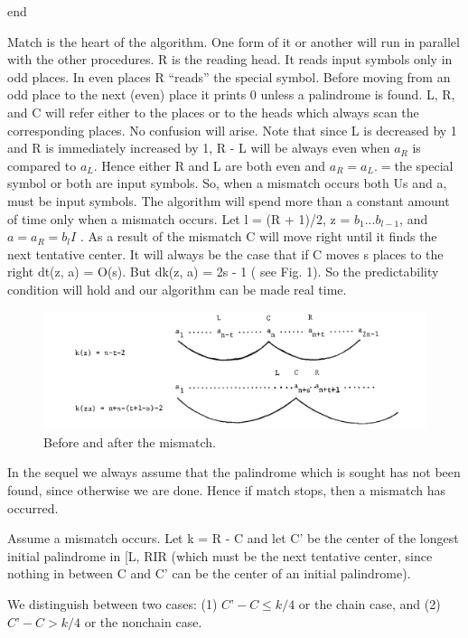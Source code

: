 \documentclass[11pt,a4paper]{report}
\begin{document}
end

Match is the heart of the algorithm. One form of it or another will run in parallel with
the other procedures. R is the reading head. It reads input symbols only in odd places.
In even places R “reads” the special symbol. Before moving from an odd place to the
next (even) place it prints 0 unless a palindrome is found. L, R, and C will refer either to
the places or to the heads which always scan the corresponding places. No confusion will
arise. Note that since L is decreased by 1 and R is immediately increased by 1, R - L
will be always even when $a_R$ is compared to $a_L$. Hence either R and L are both even and
$a_R = a_L. = $the special symbol or both are input symbols. So, when a mismatch occurs
both Us and a, must be input symbols. The algorithm will spend more than a constant
amount of time only when a mismatch occurs. Let l = (R + 1)/2, z = $b_1 ... b_{l-1}$, and 
$a=a_R= b_l I$ . As a result of the mismatch C will move right until it finds the next
tentative center. It will always be the case that if C moves s places to the right dt(z, a) =
O(s). But  dk(z, a) = 2s - 1 ( see Fig. 1). So the predictability condition will hold and
our algorithm can be made real time.

\begin{figure}[h]
    \centerline{\includegraphics{./images/1.png}}
    \caption{Before and after the mismatch.}
    \label{fig}
\end{figure}


In the sequel we always assume that the palindrome which is sought has not been
found, since otherwise we are done. Hence if match stops, then a mismatch has occurred.

Assume a mismatch occurs. Let k = R - C and let C’ be the center of the longest
initial palindrome in [L, RIR (which must be the next tentative center, since nothing in
between C and C’ can be the center of an initial palindrome).

We distinguish between two cases: (1) $C’ - C \leq k/4 $ or the chain case, and (2)
$C’ - C > k/4$ or the nonchain case.
\end{document}
